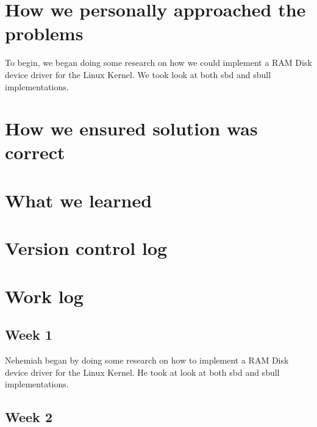 \documentclass[letterpaper,10pt,titlepage]{article}
\begin{document}
\section{How we personally approached the problems}
To begin, we began doing some research on how we could implement a RAM Disk device driver for the Linux Kernel. We took look at both sbd and sbull implementations.

\section{How we ensured solution was correct}

\section{What we learned}

\section{Version control log}
\begin{versionhistory}
\end{versionhistory}

\section{Work log}
\subsection{Week 1}
Nehemiah began by doing some research on how to implement a RAM Disk device driver for the Linux Kernel. He took at look at both sbd and sbull implementations.
\subsection{Week 2}

%
%
\end{document}
